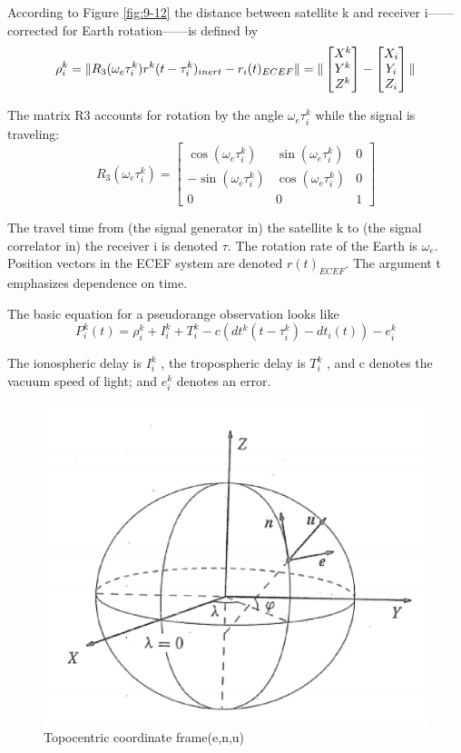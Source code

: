 	According to Figure \ref{fig:9-12} the distance between satellite k and receiver i——corrected for Earth rotation——is defined by
	\begin{equation}\label{eq:9.17}
		\rho ^k_i = \Arrowvert R_3(\omega_e\tau^k_i)r^k(t-\tau^k_i)_{inert}-r_i(t)_{ECEF} \Arrowvert = 
		\Arrowvert \begin{bmatrix}
		X^k \\ Y^k \\ Z^k
		\end{bmatrix}-
		\begin{bmatrix}
		X_i \\ Y_i \\ Z_i
		\end{bmatrix} \Arrowvert
	\end{equation}
	
	The matrix R3 accounts for rotation by the angle $\omega_e \tau^k_i$ while the signal is traveling:
	\begin{equation}
	R_3(\omega_e\tau^k_i) =
		\begin{bmatrix}
			 \cos(\omega_e\tau^k_i) & \sin(\omega_e\tau^k_i) & 0 \\
			-\sin(\omega_e\tau^k_i) & \cos(\omega_e\tau^k_i) & 0 \\
			0 & 0 & 1
		\end{bmatrix}
	\end{equation}
	
	The travel time from (the signal generator in) the satellite k to (the signal correlator in) the receiver i is denoted $\tau$. The rotation rate of the Earth is $\omega_e$. Position vectors in the ECEF system are denoted $r(t)_{ECEF}$. The argument t emphasizes dependence on time.
	
	The basic equation for a pseudorange observation looks like
	\begin{equation}\label{eq:9.19}
		P^k_i(t) = \rho^k_i+I^k_i+T^k_i-c(dt^k(t-\tau^k_i)-dt_i(t))-e^k_i
	\end{equation}
	
	The ionospheric delay is $I^k_i$ , the tropospheric delay is $T^k_i$ , and c denotes the vacuum speed of light; and $e^k_i$ denotes an error.
	\begin{figure}
		\centering
		\includegraphics[width=0.7\linewidth]{TeX_files/Part03/chapter09/image/9-13}
		\caption{Topocentric coordinate frame(e,n,u)}
		\label{fig:9-13}
	\end{figure}

